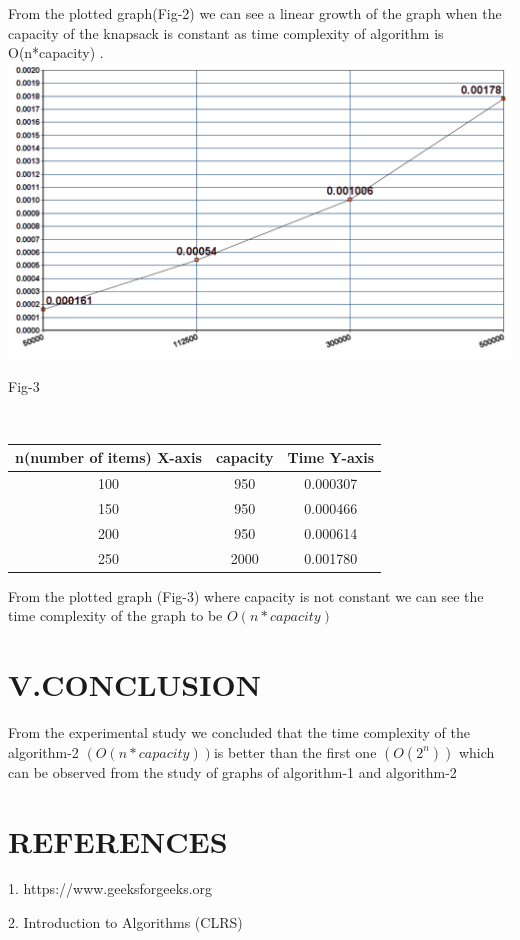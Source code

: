 \documentclass[twocolumn]{article}
\begin{document}
From the plotted graph(Fig-2) we can see a linear growth of the graph when the capacity of the knapsack is constant as time complexity of algorithm is O(n*capacity)
 \vspace{10px}.
\\
\includegraphics[width=.45\textwidth]{para3.png}
\centerline{Fig-3}\\
\begin{center}
	\begin{tabular}{ |c | c | c | }
	\hline
	
n(number of items)
X-axis
&
capacity&
Time
Y-axis







\\
	\hline



100&
950&
0.000307



\\
\hline


150&
950&
0.000466


\\
\hline


200&
950&
0.000614

 \\
	 \hline


250&
2000&
0.001780




\\
\hline
	\end{tabular}
\end{center}



From the plotted graph (Fig-3) where capacity is not constant we can see the time complexity of the graph to  be $O(n*capacity)$

\section*{V.CONCLUSION
}
From the experimental study we concluded that the time complexity  of the algorithm-2 $(O(n*capacity)) $is better than the first one $(O(2^n))$ which can be observed from the study of graphs of algorithm-1  and algorithm-2

\section*{REFERENCES    
}


  \phantom{x}\hspace{3ex}   1. https://www.geeksforgeeks.org
      
   \phantom{x}\hspace{0.97ex}   2. Introduction to Algorithms (CLRS)
\end{document}
